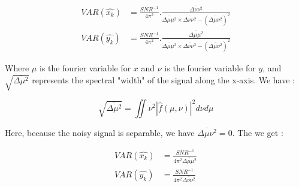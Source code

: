 \begin{align*}
VAR(\hat{x_k}) & = \frac{SNR^{-1}}{4\pi^2} . \frac{\overline{\Delta \nu \nu^2}}{\overline{\Delta \mu \mu^2} \times \overline{\Delta \nu \nu^2} - \left( \overline{\Delta \mu \nu^2} \right)^2} \\
VAR(\hat{y_k}) & = \frac{SNR^{-1}}{4\pi^2} . \frac{\overline{\Delta \mu \mu^2}}{\overline{\Delta \mu \mu^2} \times \overline{\Delta \nu \nu^2} - \left( \overline{\Delta \mu \nu^2} \right)^2}
\end{align*}


Where $\mu$ is the fourier variable for $x$ and $\nu$ is the fourier variable for $y$, and $\sqrt{\overline{\Delta \mu^2}}$ represents the spectral "width" of the signal along the x-axis. We have :

$$
\sqrt{\overline{\Delta \mu^2}} = \iint \nu^2 |\hat{f}(\mu,\nu)|^2 d\nu d\mu
$$

Here, because the noisy signal is separable, we have $ \overline{\Delta \mu \nu^2} = 0 $. The we get :


\begin{align*}
VAR(\hat{x_k}) & = \frac{SNR^{-1}}{4\pi^2\overline{\Delta \mu \mu^2}} \\
VAR(\hat{y_k}) & = \frac{SNR^{-1}}{4\pi^2\overline{\Delta \nu \nu^2}}
\end{align*}

